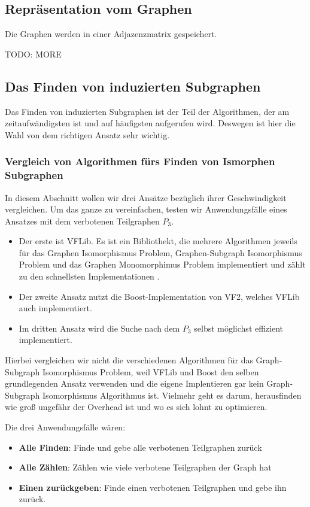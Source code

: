 \documentclass[12pt,a4paper,onecolumn,oneside,titlepage]{article}
\begin{document}
\subsection{Repräsentation vom Graphen}
Die Graphen werden in einer Adjazenzmatrix gespeichert.

TODO: MORE

\subsection{Das Finden von induzierten Subgraphen}
Das Finden von induzierten Subgraphen ist der Teil der Algorithmen, der am zeitaufwändigsten ist und auf häufigsten aufgerufen wird. Deswegen ist hier die Wahl von dem richtigen Ansatz sehr wichtig. 

\subsubsection{Vergleich von Algorithmen fürs Finden von Ismorphen Subgraphen}
In diesem Abschnitt wollen wir drei Ansätze bezüglich ihrer Geschwindigkeit vergleichen. Um das ganze zu vereinfachen, testen wir Anwendungsfälle eines Ansatzes mit dem verbotenen Teilgraphen $P_3$. 

\begin{itemize}
\item Der erste ist VFLib. Es ist ein Bibliothekt, die mehrere Algorithmen jeweils für das Graphen Isomorphismus Problem, Graphen-Subgraph Isomorphismus Problem und das Graphen Monomorphimus Problem implementiert und zählt zu den schnellsten Implementationen \cite{Cordella04}.

\item Der zweite Ansatz nutzt die Boost-Implementation von VF2, welches VFLib auch implementiert.

\item Im dritten Ansatz wird die Suche nach dem $P_3$ selbst möglichst effizient implementiert. 
\end{itemize}

Hierbei vergleichen wir nicht die verschiedenen Algorithmen für das Graph-Subgraph Isomorphismus Problem, weil VFLib und Boost den selben grundlegenden Ansatz verwenden und die eigene Implentieren gar kein Graph-Subgraph Isomorphismus Algorithmus ist. Vielmehr geht es darum, herausfinden wie groß ungefähr der Overhead ist und wo es sich lohnt zu optimieren.

Die drei Anwendungsfälle wären:
\begin{itemize}
 \item \textbf{Alle Finden}: Finde und gebe alle verbotenen Teilgraphen zurück
 \item \textbf{Alle Zählen}: Zählen wie viele verbotene Teilgraphen der Graph hat
 \item \textbf{Einen zurückgeben}: Finde einen verbotenen Teilgraphen und gebe ihn zurück.
\end{itemize}
\end{document}
